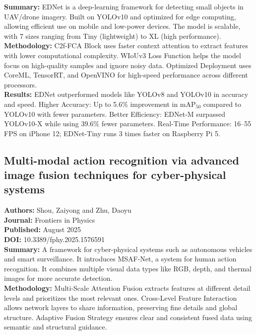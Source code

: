 \textbf{Summary:} EDNet is a deep-learning framework for detecting small objects in UAV/drone
imagery. Built on YOLOv10 and optimized for edge computing, allowing efficient use on mobile and
low-power devices. The model is scalable, with 7 sizes ranging from Tiny (lightweight) to XL (high
performance). \\

\textbf{Methodology:} C2f-FCA Block uses faster context attention to extract features with lower
computational complexity. WIoUv3 Loss Function helps the model focus on high-quality samples and
ignore noisy data. Optimized Deployment uses CoreML, TensorRT, and OpenVINO for high-speed
performance across different processors. \\

\textbf{Results:} EDNet outperformed models like YOLOv8 and YOLOv10 in accuracy and speed. Higher
Accuracy: Up to 5.6\% improvement in mAP$_{50}$ compared to YOLOv10 with fewer parameters. Better
Efficiency: EDNet-M surpassed YOLOv10-X while using 39.6\% fewer parameters. Real-Time Performance:
16–55 FPS on iPhone 12; EDNet-Tiny runs 3 times faster on Raspberry Pi 5.

\subsection{Multi-modal action recognition via advanced image fusion techniques for cyber-physical
  systems}
\textbf{Authors:} Shou, Zaiyong and Zhu, Daoyu \\
\textbf{Journal:} Frontiers in Physics \\
\textbf{Published:} August 2025 \\
\textbf{DOI:} 10.3389/fphy.2025.1576591 \\

\textbf{Summary:} A framework for cyber-physical systems such as autonomous vehicles and smart
surveillance. It introduces MSAF-Net, a system for human action recognition. It combines multiple
visual data types like RGB, depth, and thermal images for more accurate detection. \\

\textbf{Methodology:} Multi-Scale Attention Fusion extracts features at different detail levels and
prioritizes the most relevant ones. Cross-Level Feature Interaction allows network layers to share
information, preserving fine details and global structure. Adaptive Fusion Strategy ensures clear
and consistent fused data using semantic and structural guidance. \\


